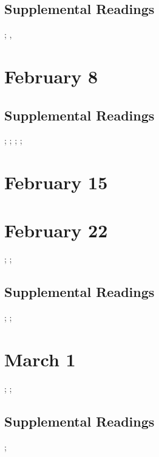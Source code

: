\documentclass[11pt]{article}
\begin{document}
\cite{Oldenziel:1999vk}

\subsection{Supplemental Readings}
\cite{Maines:1999uw}; \cite{Rossiter:1982vn}, \cite{Tichi:1987wb}


\section{February 8}

\cite{Strom:1992wx}

\subsection{Supplemental Readings}
\cite{Davies:1982vb}; \cite{Rakow:1992vx}; \cite{Pursell:1993td}; \cite{Tone:2001to}; \cite{Benson:1987wl}  

\section{February 15}

\cite{Hicks:2016uj}

\section{February 22}

\cite{Nakamura:2014gp}; \cite{Ensmenger:2010tc}; \cite{Haraway:1991uz}


\subsection{Supplemental Readings}

\cite{Ensmenger:2010te}; \cite{Milkman:1987tl}; \cite{Shetterly:2016vl}


\section{March 1}

\cite[][(selected excerpts)]{Levy:1984ut}; \cite{Eglash:2002wk}; \cite{Lagesen:2008vy}

\subsection{Supplemental Readings}

\cite{Kocurek:2015cg}; \cite{Losse:2012um}
\end{document}
